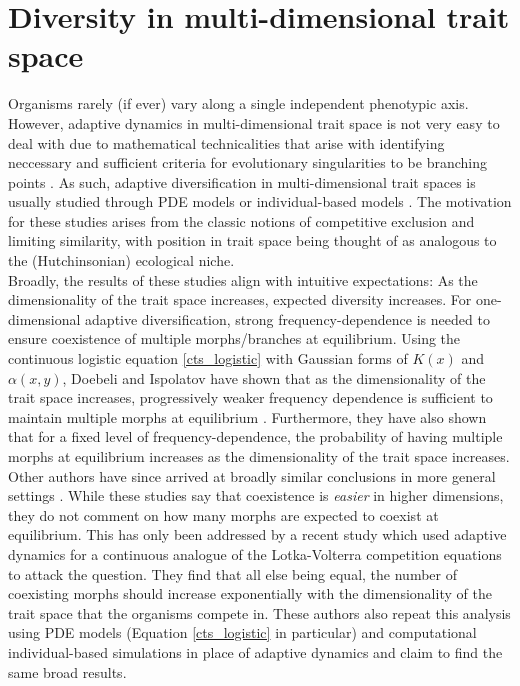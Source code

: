 \section{Diversity in multi-dimensional trait space}\label{high_dim}
Organisms rarely (if ever) vary along a single independent phenotypic axis. However, adaptive dynamics in multi-dimensional trait space is not very easy to deal with due to mathematical technicalities that arise with identifying neccessary and sufficient criteria for evolutionary singularities to be branching points \citep{doebeli_adaptive_2011,leimar_multidimensional_2009}. As such, adaptive diversification in multi-dimensional trait spaces is usually studied through PDE models or individual-based models \citep{ispolatov_individual-based_2016}.  The motivation for these studies arises from the classic notions of competitive exclusion and limiting similarity, with position in trait space being thought of as analogous to the (Hutchinsonian) ecological niche.\\
Broadly, the results of these studies align with intuitive expectations: As the dimensionality of the trait space increases, expected diversity increases. For one-dimensional adaptive diversification, strong frequency-dependence is needed to ensure coexistence of multiple morphs/branches at equilibrium. Using the continuous logistic equation \eqref{cts_logistic} with Gaussian forms of $K(x)$ and $\alpha(x,y)$, Doebeli and Ispolatov have shown that as the dimensionality of the trait space increases, progressively weaker frequency dependence is sufficient to maintain multiple morphs at equilibrium \citep{doebeli_complexity_2010}. Furthermore, they have also shown that for a fixed level of frequency-dependence, the probability of having multiple morphs at equilibrium increases as the dimensionality of the trait space increases. Other authors have since arrived at broadly similar conclusions in more general settings \citep{debarre_multidimensional_2014,svardal_organismal_2014}. While these studies say that coexistence is \textit{easier} in higher dimensions, they do not comment on how many morphs are expected to coexist at equilibrium. This has only been addressed by a recent study \citep{doebeli_diversity_2017} which used adaptive dynamics for a continuous analogue of the Lotka-Volterra competition equations to attack the question. They find that all else being equal, the number of coexisting morphs should increase exponentially with the dimensionality of the trait space that the organisms compete in. These authors also repeat this analysis using PDE models (Equation \eqref{cts_logistic} in particular) and computational individual-based simulations in place of adaptive dynamics and claim to find the same broad results.
